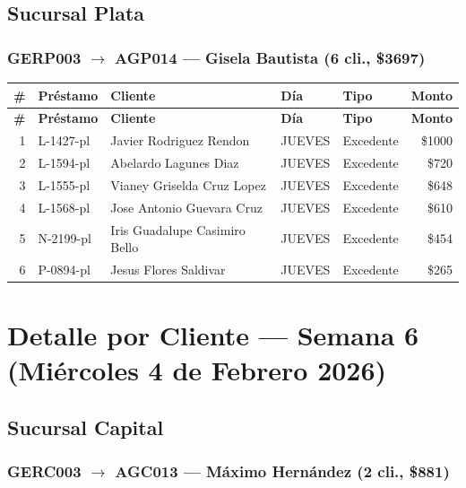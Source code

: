 \documentclass[11pt,a4paper]{article}
\newcommand{\money}[1]{\$\num{#1}}
\begin{document}
\subsection{Sucursal Plata}

\subsubsection{GERP003 $\rightarrow$ AGP014 --- Gisela Bautista (6 cli., \money{3697})}


\begin{center}
\renewcommand{\arraystretch}{1.1}
\footnotesize
\begin{longtable}{rlp{5.5cm}llr}
\toprule
\textbf{\#} & \textbf{Pr\'estamo} & \textbf{Cliente} & \textbf{D\'ia} & \textbf{Tipo} & \textbf{Monto} \\
\midrule
\endfirsthead
\toprule
\textbf{\#} & \textbf{Pr\'estamo} & \textbf{Cliente} & \textbf{D\'ia} & \textbf{Tipo} & \textbf{Monto} \\
\midrule
\endhead
1 & L-1427-pl & Javier Rodriguez Rendon & JUEVES & Excedente & \money{1000} \\
2 & L-1594-pl & Abelardo Lagunes Diaz & JUEVES & Excedente & \money{720} \\
3 & L-1555-pl & Vianey Griselda Cruz Lopez & JUEVES & Excedente & \money{648} \\
4 & L-1568-pl & Jose Antonio Guevara Cruz & JUEVES & Excedente & \money{610} \\
5 & N-2199-pl & Iris Guadalupe Casimiro Bello & JUEVES & Excedente & \money{454} \\
6 & P-0894-pl & Jesus Flores Saldivar & JUEVES & Excedente & \money{265} \\

\bottomrule
\end{longtable}
\end{center}
\newpage
\section{Detalle por Cliente --- Semana 6 (Mi\'ercoles 4 de Febrero 2026)}

\subsection{Sucursal Capital}

\subsubsection{GERC003 $\rightarrow$ AGC013 --- Máximo Hernández (2 cli., \money{881})}
\end{document}
